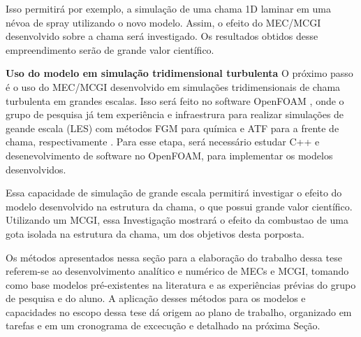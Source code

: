 Isso permitirá por exemplo, a simulação de uma chama 1D laminar em uma névoa de spray utilizando o novo modelo.
Assim, o efeito do MEC/MCGI desenvolvido sobre a chama será investigado.
Os resultados obtidos desse empreendimento serão de grande valor científico. 


\textbf{Uso do modelo em simulação tridimensional turbulenta}
O próximo passo é o uso do MEC/MCGI desenvolvido em simulações tridimensionais de chama turbulenta em grandes escalas.
Isso será feito no software OpenFOAM \source{}, onde o grupo de pesquisa já tem experiência e infraestrura para realizar simulações de geande escala (LES) com métodos FGM para química e ATF para a frente de chama, respectivamente \cite{SacomanoF2017PhD,SacomanoF2017CF,SacomanoF2020CF}.
Para esse etapa, será necessário estudar C++ e desenevolvimento de software no OpenFOAM, para implementar os modelos desenvolvidos.

Essa capacidade de simulação de grande escala permitirá investigar o efeito do modelo desenvolvido na estrutura da chama, o que possui grande valor científico.
Utilizando um MCGI, essa Investigação mostrará o efeito da combustao de uma gota isolada na estrutura da chama, um dos objetivos desta porposta.

Os métodos apresentados nessa seção para a elaboração do trabalho dessa tese referem-se ao desenvolvimento analítico e numérico de MECs e MCGI, tomando como base modelos pré-existentes na literatura e as experiências prévias do grupo de pesquisa e do aluno.
A aplicação desses métodos para os modelos e capacidades no escopo dessa tese dá origem ao plano de trabalho, organizado em tarefas e em um cronograma de excecução e detalhado na próxima Seção.


